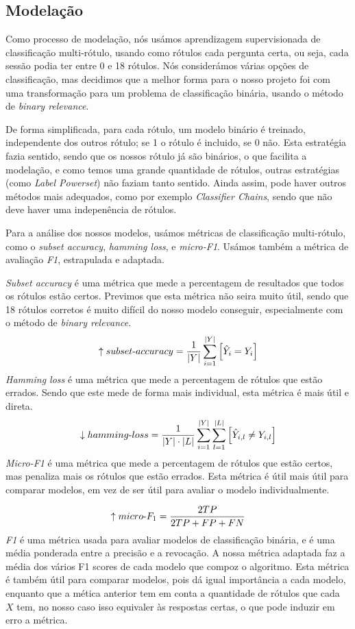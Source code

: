 \documentclass[justified, 11pt]{scrartcl}
\begin{document}
  \subsection{Modelação}
  Como processo de modelação, nós usámos aprendizagem supervisionada de classificação multi-rótulo, usando como rótulos cada pergunta certa, ou seja, cada sessão podia ter entre 0 e 18 rótulos. Nós considerámos várias opções de classificação, mas decidimos que a melhor forma para o nosso projeto foi com uma transformação para um problema de classificação binária, usando o método de \textit{binary relevance}.
  
  De forma simplificada, para cada rótulo, um modelo binário é treinado, independente dos outros rótulo; se 1 o rótulo é incluido, se 0 não. Esta estratégia fazia sentido, sendo que os nossos rótulo já são binários, o que facilita a modelação, e como temos uma grande quantidade de rótulos, outras estratégias (como \textit{Label Powerset}) não faziam tanto sentido. Ainda assim, pode haver outros métodos mais adequados, como por exemplo \textit{Classifier Chains}, sendo que não deve haver uma indepenência de rótulos.

  Para a análise dos nossos modelos, usámos métricas de classificação multi-rótulo, como o \textit{subset accuracy}, \textit{hamming loss}, e \textit{micro-F1}. Usámos também a métrica de avaliação \textit{F1}, estrapulada e adaptada.

  \textit{Subset accuracy} é uma métrica que mede a percentagem de resultados que todos os rótulos estão certos. Previmos que esta métrica não seira muito útil, sendo que 18 rótulos corretos é muito difícil do nosso modelo conseguir, especialmente com o método de \textit{binary relevance}.
  $$
  \uparrow \mathnormal{subset\text{-}accuracy} = \frac{1}{|Y|} \sum_{i=1}^{|Y|}  \left[ 
    \hat{Y}_i = Y_i
    \right] 
  $$
  \textit{Hamming loss} é uma métrica que mede a percentagem de rótulos que estão errados. Sendo que este mede de forma mais individual, esta métrica é mais útil e direta.
  $$
  \downarrow \mathnormal{hamming\text{-}loss} = \frac{1}{|Y|\cdot|L|} \sum_{i=1}^{|Y|} \sum_{l=1}^{|L|} \left[ 
    \hat{Y}_{i,l} \neq Y_{i,l}
    \right]
  $$
  \textit{Micro-F1} é uma métrica que mede a percentagem de rótulos que estão certos, mas penaliza mais os rótulos que estão errados. Esta métrica é útil mais útil para comparar modelos, em vez de ser útil para avaliar o modelo individualmente.

  $$
  \uparrow \mathnormal{micro\text{-}}F_1 = \frac{2 TP}{2TP + FP + FN}
  $$
  \textit{F1} é uma métrica usada para avaliar modelos de classificação binária, e é uma média ponderada entre a precisão e a revocação. A nossa métrica adaptada faz a média dos vários F1 scores de cada modelo que compoz o algoritmo. Esta métrica é também útil para comparar modelos, pois dá igual importância a cada modelo, enquanto que a mética anterior tem em conta a quantidade de rótulos que cada $X$ tem, no nosso caso isso equivaler às respostas certas, o que pode induzir em erro a métrica.
\end{document}
